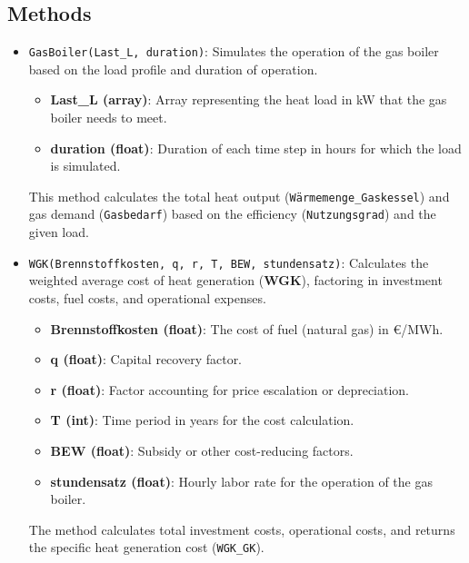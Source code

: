 \subsection{Methods}
\begin{itemize}
    \item \texttt{GasBoiler(Last\_L, duration)}: 
    Simulates the operation of the gas boiler based on the load profile and duration of operation.
    \begin{itemize}
        \item \textbf{Last\_L (array)}: Array representing the heat load in kW that the gas boiler needs to meet.
        \item \textbf{duration (float)}: Duration of each time step in hours for which the load is simulated.
    \end{itemize}
    This method calculates the total heat output (\texttt{Wärmemenge\_Gaskessel}) and gas demand (\texttt{Gasbedarf}) based on the efficiency (\texttt{Nutzungsgrad}) and the given load.

    \item \texttt{WGK(Brennstoffkosten, q, r, T, BEW, stundensatz)}:
    Calculates the weighted average cost of heat generation (\textbf{WGK}), factoring in investment costs, fuel costs, and operational expenses.
    \begin{itemize}
        \item \textbf{Brennstoffkosten (float)}: The cost of fuel (natural gas) in €/MWh.
        \item \textbf{q (float)}: Capital recovery factor.
        \item \textbf{r (float)}: Factor accounting for price escalation or depreciation.
        \item \textbf{T (int)}: Time period in years for the cost calculation.
        \item \textbf{BEW (float)}: Subsidy or other cost-reducing factors.
        \item \textbf{stundensatz (float)}: Hourly labor rate for the operation of the gas boiler.
    \end{itemize}
    The method calculates total investment costs, operational costs, and returns the specific heat generation cost (\texttt{WGK\_GK}).


\end{itemize}

